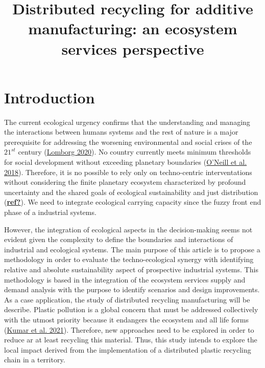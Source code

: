 \documentclass[
  14pt,
]{extarticle}
\title{Distributed recycling for additive manufacturing: an ecosystem services perspective}
\author{}
\date{\vspace{-2.5em}}
\begin{document}
\maketitle

{
\hypersetup{linkcolor=}
\setcounter{tocdepth}{2}
\tableofcontents
}
\linenumbers

\hypertarget{introduction}{%
\section{Introduction}\label{introduction}}

The current ecological urgency confirms that the understanding and managing the interactions between humans systems and the rest of nature is a major prerequisite for addressing the worsening environmental and social crises of the \(21^{st}\) century (\protect\hyperlink{ref-Lomborg2020}{Lomborg 2020}).
No country currently meets minimum thresholds for social development without exceeding planetary boundaries (\protect\hyperlink{ref-ONeill2018}{O'Neill et al. 2018}).
Therefore, it is no possible to rely only on techno-centric interventations without considering the finite planetary ecosystem characterized by profound uncertainty and the shared goals of ecological sustainability and just distribution (\protect\hyperlink{ref-ref}{\textbf{ref?}}).
We need to integrate ecological carrying capacity since the fuzzy front end phase of a industrial systems.

However, the integration of ecological aspects in the decision-making seems not evident given the complexity to define the boundaries and interactions of industrial and ecological systems.
The main purpose of this article is to propose a methodology in order to evaluate the techno-ecological synergy with identifying relative and absolute sustainability aspect of prospective industrial systems.
This methodology is based in the integration of the ecosystem services supply and demand analysis with the purpose to identify scenarios and design improvements.
As a case application, the study of distributed recycling manufacturing will be describe.
Plastic pollution is a global concern that must be addressed collectively with the utmost priority because it endangers the ecosystem and all life forms (\protect\hyperlink{ref-Kumar2021}{Kumar et al. 2021}).
Therefore, new approaches need to be explored in order to reduce ar at least recycling this material.
Thus, this study intends to explore the local impact derived from the implementation of a distributed plastic recycling chain in a territory.
\end{document}
